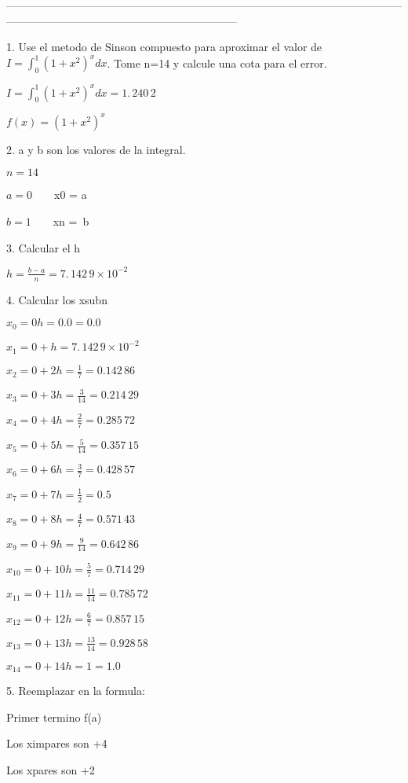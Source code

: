 \documentclass{article}
\begin{document}
\bigskip
---------------------------------------------------------------------------------------------------------------------------------------------------------------------------

1. Use el metodo de Sinson compuesto para aproximar el valor de $%
I=\int_{0}^{1}(1+x^{2})^{x}dx$. Tome n=14 y calcule una cota para el error.

$I=\int_{0}^{1}(1+x^{2})^{x}dx=\allowbreak 1.\,\allowbreak 240\,2$

$f(x)=(1+x^{2})^{x}$

2. a y b son los valores de la integral.

$n=14$

$a=0\qquad $x0 = a

$b=1\qquad $xn =\ b

3. Calcular el h

$h=\frac{b-a}{n}=\allowbreak 7.\,\allowbreak 142\,9\times 10^{-2}$

4. Calcular los xsubn

$x_{0}=0h=\allowbreak 0.0=0.0$

$x_{1}=0+h=\allowbreak 7.\,\allowbreak 142\,9\times 10^{-2}$

$x_{2}=0+2h=\allowbreak \frac{1}{7}=0.142\,86$

$x_{3}=0+3h=\allowbreak \frac{3}{14}=0.214\,29$

$x_{4}=0+4h=\allowbreak \frac{2}{7}=0.285\,72$

$x_{5}=0+5h=\allowbreak \frac{5}{14}=0.357\,15$

$x_{6}=0+6h=\allowbreak \frac{3}{7}=0.428\,57$

$x_{7}=0+7h=\allowbreak \frac{1}{2}=0.5$

$x_{8}=0+8h=\allowbreak \frac{4}{7}=0.571\,43$

$x_{9}=0+9h=\allowbreak \frac{9}{14}=0.642\,86$

$x_{10}=0+10h=\allowbreak \frac{5}{7}=0.714\,29$

$x_{11}=0+11h=\allowbreak \frac{11}{14}=0.785\,72$

$x_{12}=0+12h=\allowbreak \frac{6}{7}=0.857\,15$

$x_{13}=0+13h=\allowbreak \frac{13}{14}=0.928\,58$

$x_{14}=0+14h=\allowbreak 1=1.0$

5. Reemplazar en la formula:

Primer termino f(a)

Los ximpares son +4

Los xpares son +2
\end{document}
